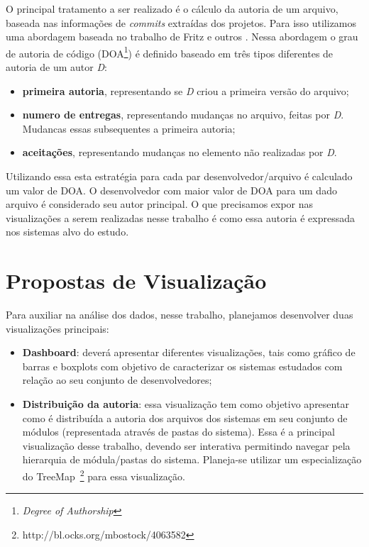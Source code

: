 \documentclass[12pt]{article}
\begin{document}
O principal tratamento a ser realizado é o cálculo da autoria de um arquivo, baseada nas informações de \textit{commits} extraídas dos projetos. Para isso utilizamos uma abordagem baseada no trabalho de Fritz e outros \cite{Fritz2014}. Nessa abordagem o grau de autoria de código (DOA\footnote{\textit{Degree of Authorship}}) é definido baseado em três tipos diferentes de autoria de um autor \textit{D}:
\begin{itemize}
    \item \textbf{primeira autoria}, representando se \textit{D} criou a primeira versão do arquivo;
    \item \textbf{numero de entregas}, representando mudanças no arquivo, feitas por \textit{D}. Mudancas essas subsequentes a primeira autoria;
    \item \textbf{aceitações}, representando mudanças no elemento não realizadas por \textit{D}. 
\end{itemize}

Utilizando essa esta estratégia para cada par desenvolvedor/arquivo é calculado um valor de DOA. O desenvolvedor com maior valor de DOA para um dado arquivo é considerado seu autor principal. O que precisamos expor nas visualizações a serem realizadas nesse trabalho é como essa autoria é expressada nos sistemas alvo do estudo.

\section{Propostas de Visualização}

Para auxiliar na análise dos dados, nesse trabalho, planejamos desenvolver duas visualizações principais:
\begin{itemize}
    \item \textbf{Dashboard}: deverá apresentar diferentes visualizações, tais como gráfico de barras e boxplots com objetivo de caracterizar os sistemas estudados com relação ao seu conjunto de desenvolvedores;
    \item \textbf{Distribuição da autoria}: essa visualização tem como objetivo apresentar como é distribuída a autoria dos arquivos dos sistemas em seu conjunto de módulos (representada através de pastas do sistema). Essa é a principal visualização desse trabalho, devendo ser interativa permitindo navegar pela hierarquia de módula/pastas do sistema. Planeja-se utilizar um especialização do TreeMap~\footnote{http://bl.ocks.org/mbostock/4063582} para essa visualização. 
\end{itemize}
\footnotesize


\end{document}
